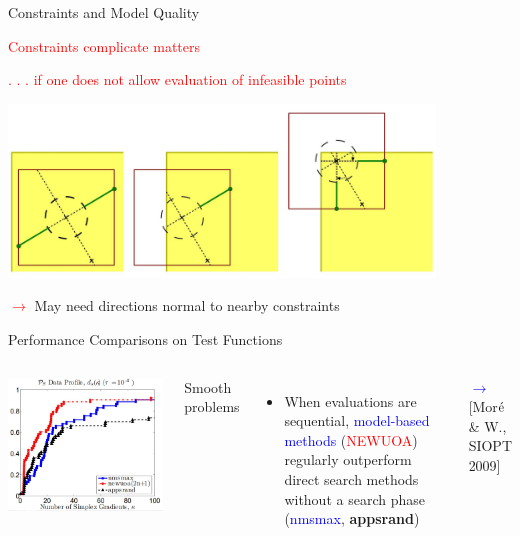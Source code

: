 \documentclass[handout,aspectratio=54]{beamer}
\numberwithin{theorem}{section}
\begin{document}
\begin{frame}{Constraints and Model Quality}
\begin{center}
\textcolor{red}{Constraints complicate matters}

\textcolor{red}{. . . if one does not allow evaluation of infeasible points}

\includegraphics[width=0.85\textwidth]{fig/32.jpg}
\end{center}

\textcolor{red}{$\rightarrow$} May need directions normal to nearby constraints
\end{frame}

\begin{frame}{Performance Comparisons on Test Functions}
\begin{columns}
\includegraphics[width=\textwidth]{fig/33-1.jpg}

\begin{center}
Smooth problems
\end{center}

\begin{itemize}\footnotesize
\item When evaluations are sequential, \textcolor{blue}{model-based methods} (\textcolor{red}{NEWUOA}) regularly outperform direct search methods without a search phase (\textcolor{blue}{nmsmax}, \textbf{appsrand})
\end{itemize}
\scriptsize
\textcolor{blue}{$\rightarrow$}\textcolor[RGB]{128,0,128}{[Mor$\acute{\textup{e}}$ \& W., SIOPT 2009]}
\end{columns}
\end{frame}
\end{document}
